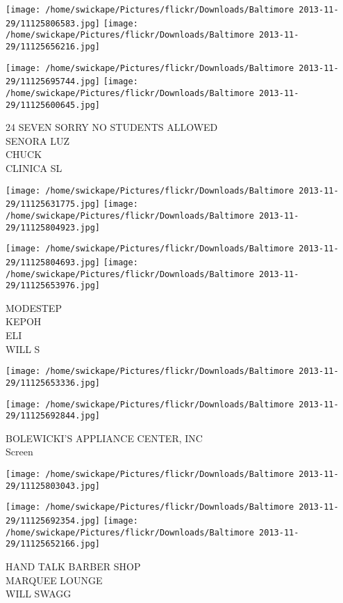\documentclass[10pt,letterpaper]{article}
\begin{document}
\texttt{[image: /home/swickape/Pictures/flickr/Downloads/Baltimore 2013-11-29/11125806583.jpg]}
\texttt{[image: /home/swickape/Pictures/flickr/Downloads/Baltimore 2013-11-29/11125656216.jpg]}

\texttt{[image: /home/swickape/Pictures/flickr/Downloads/Baltimore 2013-11-29/11125695744.jpg]}
\texttt{[image: /home/swickape/Pictures/flickr/Downloads/Baltimore 2013-11-29/11125600645.jpg]}

24 SEVEN SORRY NO STUDENTS ALLOWED\\
SENORA LUZ\\
CHUCK\\
CLINICA SL
\pagebreak

\texttt{[image: /home/swickape/Pictures/flickr/Downloads/Baltimore 2013-11-29/11125631775.jpg]}
\texttt{[image: /home/swickape/Pictures/flickr/Downloads/Baltimore 2013-11-29/11125804923.jpg]}

\texttt{[image: /home/swickape/Pictures/flickr/Downloads/Baltimore 2013-11-29/11125804693.jpg]}
\texttt{[image: /home/swickape/Pictures/flickr/Downloads/Baltimore 2013-11-29/11125653976.jpg]}

MODESTEP\\
KEPOH\\
ELI\\
WILL S
\pagebreak

\texttt{[image: /home/swickape/Pictures/flickr/Downloads/Baltimore 2013-11-29/11125653336.jpg]}

\vspace{0.25in}
\texttt{[image: /home/swickape/Pictures/flickr/Downloads/Baltimore 2013-11-29/11125692844.jpg]}

BOLEWICKI'S APPLIANCE CENTER, INC\\
Screen
\pagebreak

\texttt{[image: /home/swickape/Pictures/flickr/Downloads/Baltimore 2013-11-29/11125803043.jpg]}

\vspace{0.25in}
\texttt{[image: /home/swickape/Pictures/flickr/Downloads/Baltimore 2013-11-29/11125692354.jpg]}
\texttt{[image: /home/swickape/Pictures/flickr/Downloads/Baltimore 2013-11-29/11125652166.jpg]}

HAND TALK BARBER SHOP\\
MARQUEE LOUNGE\\
WILL SWAGG
\pagebreak
\end{document}
